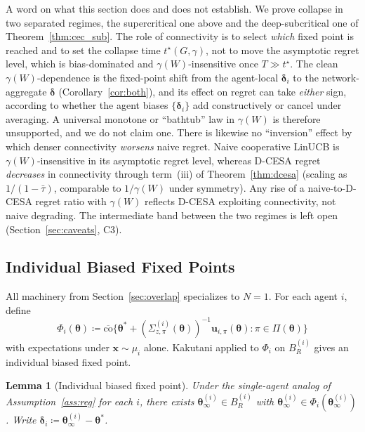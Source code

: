 \documentclass[11pt]{article}
\newtheorem{lemma}[theorem]{Lemma}
\begin{document}
A word on what this section does and does not establish. We prove
collapse in two separated regimes, the supercritical one above and the
deep-subcritical one of Theorem~\ref{thm:cec_sub}.  The role of
connectivity is to select \emph{which} fixed point is reached and to set
the collapse time $t^\star(G,\gamma)$, not to move the asymptotic regret
level, which is bias-dominated and $\gamma(W)$-insensitive once
$T\gg t^\star$.  The clean $\gamma(W)$-dependence is the fixed-point
shift from the agent-local $\bm{\delta}_i$ to the network-aggregate
$\bm{\delta}$ (Corollary~\ref{cor:both}), and its effect on regret can
take \emph{either} sign, according to whether the agent biases
$\{\bm{\delta}_i\}$ add constructively or cancel under averaging.  A
universal monotone or ``bathtub'' law in $\gamma(W)$ is therefore
unsupported, and we do not claim one.
There is likewise no ``inversion'' effect by which denser connectivity
\emph{worsens} naive regret.  Naive cooperative LinUCB is
$\gamma(W)$-insensitive in its asymptotic regret level, whereas D-CESA
regret \emph{decreases} in connectivity through term~(iii) of
Theorem~\ref{thm:dcesa} (scaling as $1/(1-\bar\tau)$, comparable to
$1/\gamma(W)$ under symmetry).  Any rise of a naive-to-D-CESA regret
ratio with $\gamma(W)$ reflects D-CESA exploiting connectivity, not naive
degrading.
The intermediate band between the two regimes is left open
(Section~\ref{sec:caveats}, C3).

\subsection{Individual Biased Fixed Points}\label{sec:indiv}

All machinery from Section~\ref{sec:overlap} specializes to $N=1$.
For each agent $i$, define
\[
\Phi_i(\bm{\theta})\coloneqq
\overline{\mathrm{co}}\bigl\{
\bm{\theta}^{\!*}+(\Sigma_{z,\pi}^{(i)}(\bm{\theta}))^{-1}
\bm{u}_{i,\pi}(\bm{\theta}):\pi\in\Pi(\bm{\theta})\bigr\}
\]
with expectations under $\bm{x}\sim\mu_i$ alone.
Kakutani applied to $\Phi_i$ on $B_R^{(i)}$ gives an individual biased
fixed point.

\begin{lemma}[Individual biased fixed point]\label{lem:fp_ind}
Under the single-agent analog of Assumption~\ref{ass:reg} for each $i$,
there exists $\bm{\theta}_\infty^{(i)}\in B_R^{(i)}$ with
$\bm{\theta}_\infty^{(i)}\in\Phi_i(\bm{\theta}_\infty^{(i)})$.
Write $\bm{\delta}_i\coloneqq\bm{\theta}_\infty^{(i)}-\bm{\theta}^{\!*}$.
\end{lemma}
\end{document}
